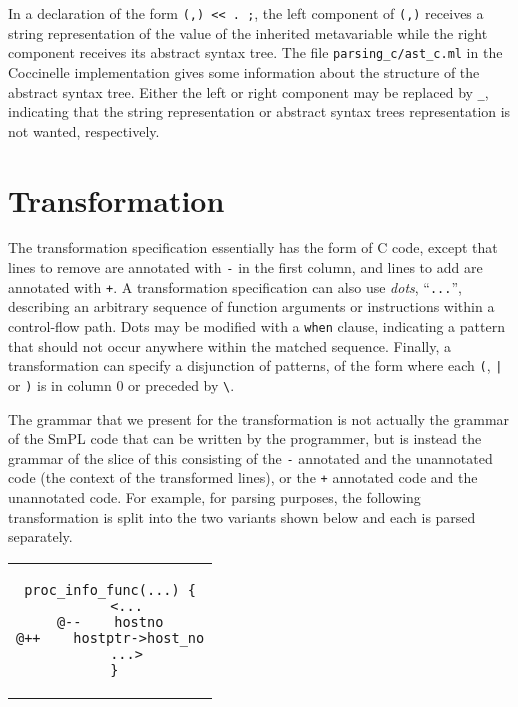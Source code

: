 \noindent
In a declaration of the form \texttt{(,) <{}<
  . ;}, the left component of \texttt{(,)}
receives a string representation of the value of the inherited metavariable
while the right component receives its abstract syntax tree.  The file
\texttt{parsing\_c/ast\_c.ml} in the Coccinelle implementation gives some
information about the structure of the abstract syntax tree.  Either the
left or right component may be replaced by \verb+_+, indicating that the
string representation or abstract syntax trees representation is not
wanted, respectively.

\section{Transformation}

The transformation specification essentially has the form of C code,
except that lines to remove are annotated with \verb+-+ in the first
column, and lines to add are annotated with \verb-+-.  A
transformation specification can also use {\em dots}, ``\verb-...-'',
describing an arbitrary sequence of function arguments or instructions
within a control-flow path.  Dots may be modified with a {\tt when}
clause, indicating a pattern that should not occur anywhere within the
matched sequence.  Finally, a transformation can specify a disjunction
of patterns, of the form  where each \texttt{(}, \texttt{|} or
\texttt{)} is in column 0 or preceded by \texttt{\textbackslash}.

The grammar that we present for the transformation is not actually the
grammar of the SmPL code that can be written by the programmer, but is
instead the grammar of the slice of this consisting of the {\tt -}
annotated and the unannotated code (the context of the transformed lines),
or the {\tt +} annotated code and the unannotated code.  For example, for
parsing purposes, the following transformation
is split into the two variants shown below and each is parsed
separately.

\begin{center}
\begin{tabular}{c}
\begin{lstlisting}[language=Cocci]
  proc_info_func(...) {
    <...
@--    hostno
@++    hostptr->host_no
    ...>
 }
\end{lstlisting}\\
\end{tabular}
\end{center}

